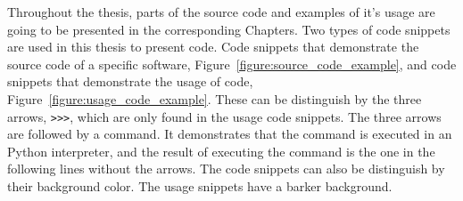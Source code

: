 \begin{table}[htbp]
    \centering
    \caption{Citations and GitHub url for source code and data used in the thesis.}
    \label{table:source_code_data_citations}
\end{table}

Throughout the thesis, parts of the source code and examples of it's usage are
going to be presented in the corresponding Chapters. Two types of code snippets
are used in this thesis to present code. Code snippets that demonstrate the
source code of a specific software, Figure~\ref{figure:source_code_example}, and
code snippets that demonstrate the usage of code,
Figure~\ref{figure:usage_code_example}. These can be distinguish by the three arrows,
\texttt{>>>}, which are only found in the usage code snippets.
The three arrows are followed by a command. It
demonstrates that the command is executed in an Python interpreter, and the result of executing the command
is the one in the following lines without the arrows.
The code snippets can also be distinguish by their background color. The usage
snippets have a barker background.

